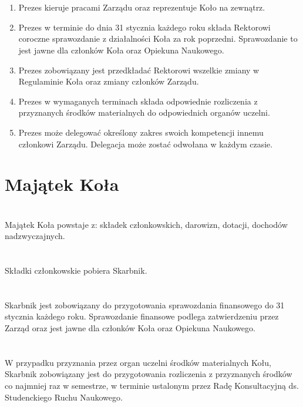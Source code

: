 \documentclass[a4paper]{article}
\begin{document}
\section{}
\begin{enumerate}
\item Prezes kieruje pracami Zarządu oraz reprezentuje Koło na zewnątrz.
\item Prezes w terminie do dnia 31 stycznia każdego roku składa Rektorowi coroczne sprawozdanie z działalności Koła za rok poprzedni. Sprawozdanie to jest jawne dla członków Koła oraz Opiekuna Naukowego.
\item Prezes zobowiązany jest przedkładać Rektorowi wszelkie zmiany w Regulaminie Koła oraz zmiany członków Zarządu.
\item Prezes w wymaganych terminach składa odpowiednie rozliczenia z przyznanych środków materialnych do odpowiednich organów uczelni.
\item Prezes może delegować określony zakres swoich kompetencji innemu członkowi Zarządu. Delegacja może zostać odwołana w każdym czasie.
\end{enumerate}

\section*{Majątek Koła~~~}
\section{}
Majątek Koła powstaje z: składek członkowskich, darowizn, dotacji, dochodów nadzwyczajnych.
 
\section{}
Składki członkowskie pobiera Skarbnik.
 
\section{}
Skarbnik jest zobowiązany do przygotowania sprawozdania finansowego do 31 stycznia każdego roku. Sprawozdanie finansowe podlega zatwierdzeniu przez Zarząd oraz jest jawne dla członków Koła oraz Opiekuna Naukowego.

\section{}
W przypadku przyznania przez organ uczelni środków materialnych Kołu, Skarbnik zobowiązany jest do przygotowania rozliczenia z przyznanych środków co najmniej raz w semestrze, w terminie ustalonym przez Radę Konsultacyjną ds. Studenckiego Ruchu Naukowego.
\end{document}
